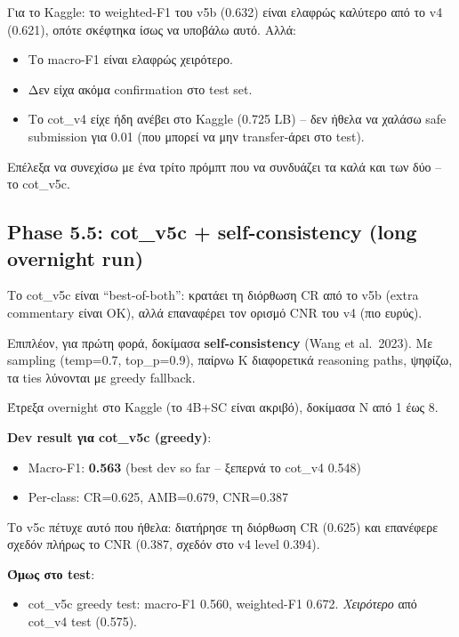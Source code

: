 \documentclass[12pt]{fphw}
\begin{document}
Για το Kaggle: το weighted-F1 του v5b (0.632) είναι ελαφρώς καλύτερο από το v4 (0.621), οπότε σκέφτηκα ίσως να υποβάλω αυτό. Αλλά:

\begin{itemize}
    \item Το macro-F1 είναι ελαφρώς χειρότερο.
    \item Δεν είχα ακόμα confirmation στο test set.
    \item Το cot\_v4 είχε ήδη ανέβει στο Kaggle (0.725 LB) -- δεν ήθελα να χαλάσω safe submission για 0.01 (που μπορεί να μην transfer-άρει στο test).
\end{itemize}

Επέλεξα να συνεχίσω με ένα τρίτο πρόμπτ που να συνδυάζει τα καλά και των δύο -- το cot\_v5c.

\subsection{Phase 5.5: cot\_v5c + self-consistency (long overnight run)}

Το cot\_v5c είναι ``best-of-both'': κρατάει τη διόρθωση CR από το v5b (extra commentary είναι OK), αλλά επαναφέρει τον ορισμό CNR του v4 (πιο ευρύς).

Επιπλέον, για πρώτη φορά, δοκίμασα \textbf{self-consistency} (Wang et al.\ 2023). Με sampling (temp=0.7, top\_p=0.9), παίρνω K διαφορετικά reasoning paths, ψηφίζω, τα ties λύνονται με greedy fallback.

Έτρεξα overnight στο Kaggle (το 4B+SC είναι ακριβό), δοκίμασα N από 1 έως 8.

\textbf{Dev result για cot\_v5c (greedy)}:

\begin{itemize}
    \item Macro-F1: \textbf{0.563} (best dev so far -- ξεπερνά το cot\_v4 0.548)
    \item Per-class: CR=0.625, AMB=0.679, CNR=0.387
\end{itemize}

Το v5c πέτυχε αυτό που ήθελα: διατήρησε τη διόρθωση CR (0.625) και επανέφερε σχεδόν πλήρως το CNR (0.387, σχεδόν στο v4 level 0.394).

\textbf{Όμως στο test}:

\begin{itemize}
    \item cot\_v5c greedy test: macro-F1 0.560, weighted-F1 0.672. \emph{Χειρότερο} από cot\_v4 test (0.575).
\end{itemize}
\end{document}

